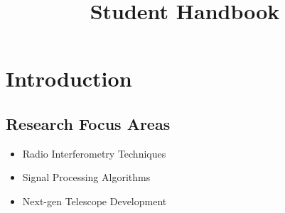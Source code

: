 \documentclass[12pt]{article}
\title{Student Handbook}
\author{}  %
\date{\the\year}
\begin{document}
\maketitle

\newpage

\section{Introduction}

\subsection{Research Focus Areas}
\begin{itemize}
    \item Radio Interferometry Techniques
    \item Signal Processing Algorithms
    \item Next-gen Telescope Development
\end{itemize}
\end{document}
